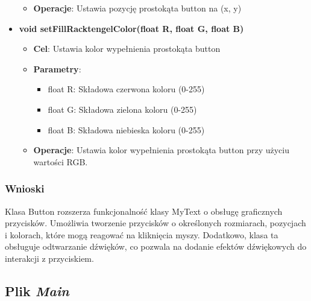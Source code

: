 \documentclass[a4paper, 10pt]{article}
\begin{document}
\begin{itemize}
\begin{itemize}
			\item \textbf{Operacje}: Ustawia pozycję prostokąta button na (x, y)
		\end{itemize}
	\item \textbf{void setFillRacktengelColor(float R, float G, float B)}
		\begin{itemize}
			\item \textbf{Cel}: Ustawia kolor wypełnienia prostokąta button
			\item \textbf{Parametry}:
				\begin{itemize}
					\item float R: Składowa czerwona koloru (0-255)
					\item float G: Składowa zielona koloru (0-255)
					\item float B: Składowa niebieska koloru (0-255)
				\end{itemize}
			\item \textbf{Operacje}: Ustawia kolor wypełnienia prostokąta button przy użyciu wartości RGB.
		\end{itemize}
\end{itemize}
\subsubsection{Wnioski}
Klasa Button rozszerza funkcjonalność klasy MyText o obsługę graficznych przycisków. Umożliwia tworzenie przycisków o określonych rozmiarach, pozycjach i kolorach, które mogą reagować na kliknięcia myszy. Dodatkowo, klasa ta obsługuje odtwarzanie dźwięków, co pozwala na dodanie efektów dźwiękowych do interakcji z przyciskiem.


\subsection{Plik \textit{Main}}

\end{document}
